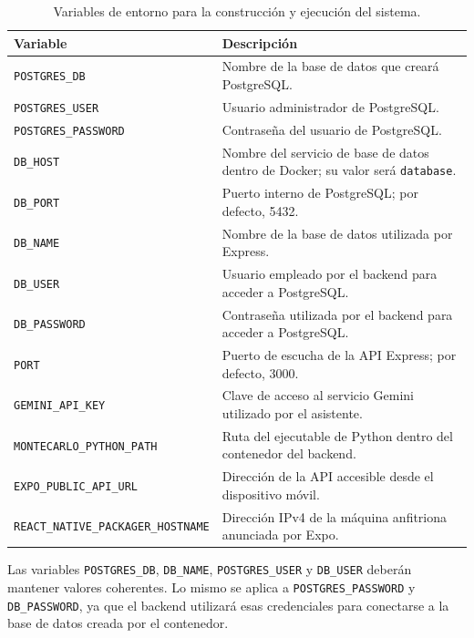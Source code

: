 \begin{table}[H]
\centering
\caption{Variables de entorno para la construcci\'on y ejecuci\'on del sistema.}
\label{tab:variables-entorno-construccion}
\begin{tabular}{|l|p{8.2cm}|}
\hline
\textbf{Variable} & \textbf{Descripci\'on} \\
\hline
\texttt{POSTGRES\_DB} & Nombre de la base de datos que crear\'a PostgreSQL. \\
\hline
\texttt{POSTGRES\_USER} & Usuario administrador de PostgreSQL. \\
\hline
\texttt{POSTGRES\_PASSWORD} & Contrase\~na del usuario de PostgreSQL. \\
\hline
\texttt{DB\_HOST} & Nombre del servicio de base de datos dentro de Docker; su valor ser\'a \texttt{database}. \\
\hline
\texttt{DB\_PORT} & Puerto interno de PostgreSQL; por defecto, 5432. \\
\hline
\texttt{DB\_NAME} & Nombre de la base de datos utilizada por Express. \\
\hline
\texttt{DB\_USER} & Usuario empleado por el backend para acceder a PostgreSQL. \\
\hline
\texttt{DB\_PASSWORD} & Contrase\~na utilizada por el backend para acceder a PostgreSQL. \\
\hline
\texttt{PORT} & Puerto de escucha de la API Express; por defecto, 3000. \\
\hline
\texttt{GEMINI\_API\_KEY} & Clave de acceso al servicio Gemini utilizado por el asistente. \\
\hline
\texttt{MONTECARLO\_PYTHON\_PATH} & Ruta del ejecutable de Python dentro del contenedor del backend. \\
\hline
\texttt{EXPO\_PUBLIC\_API\_URL} & Direcci\'on de la API accesible desde el dispositivo m\'ovil. \\
\hline
\texttt{REACT\_NATIVE\_PACKAGER\_HOSTNAME} & Direcci\'on IPv4 de la m\'aquina anfitriona anunciada por Expo. \\
\hline
\end{tabular}
\end{table}

Las variables \texttt{POSTGRES\_DB}, \texttt{DB\_NAME},
\texttt{POSTGRES\_USER} y \texttt{DB\_USER} deber\'an mantener valores
coherentes. Lo mismo se aplica a \texttt{POSTGRES\_PASSWORD} y
\texttt{DB\_PASSWORD}, ya que el backend utilizar\'a esas credenciales para
conectarse a la base de datos creada por el contenedor.

